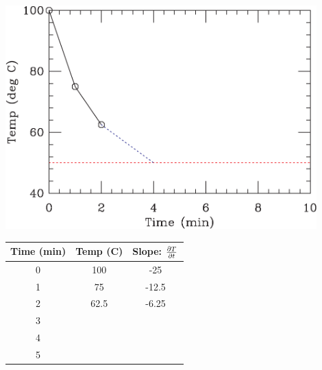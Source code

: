 \documentclass[12ampt]{article}
\def\PAR#1#2{ {{\partial #1}\over{\partial #2}} }
\begin{document}
\begin{minipage}{0.5\textwidth}
\includegraphics[width=0.9\textwidth]{fig2-crop.pdf}
\end{minipage}
\begin{minipage}{0.5\textwidth}
\begin{tabular}{|c | c | c |}
\hline
Time (min) & Temp (C) & Slope: $\PAR{T}{t}$ \\
\hline
0 & 100 & -25 \\
\hline
1 & 75 &  -12.5\\
\hline
2 & 62.5& -6.25 \\
\hline
3 & &  \\
\hline
4 & &  \\
\hline
5 & &  \\
\hline
\end{tabular}
\end{minipage}
\end{document}
